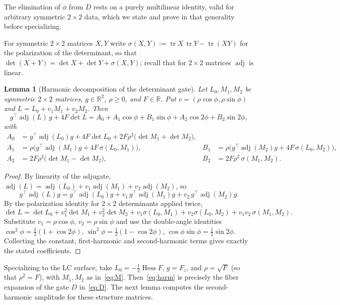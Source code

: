 \documentclass[11pt,reqno]{amsart}
\theoremstyle{plain}
\newtheorem{lemma}[theorem]{Lemma}
\theoremstyle{definition}
\DeclareMathOperator{\tr}{tr}
\DeclareMathOperator{\adj}{adj}
\DeclareMathOperator{\Hess}{Hess}
\newcommand{\R}{\mathbb{R}}
\newcommand{\Fz}{F_{z}}
\begin{document}
The elimination of $\phi$ from $D$ rests on a purely multilinear identity, valid for arbitrary symmetric $2\times2$ data, which we state and prove in that generality before specializing.

For symmetric $2\times2$ matrices $X,Y$ write $\sigma(X,Y):=\tr X\,\tr Y-\tr(XY)$ for the polarization of the determinant, so that $\det(X+Y)=\det X+\det Y+\sigma(X,Y)$; recall that for $2\times2$ matrices $\adj$ is linear.

\begin{lemma}[Harmonic decomposition of the determinant gate]\label{lem:harm}
Let $L_0,M_1,M_2$ be symmetric $2\times 2$ matrices, $g\in\R^2$, $\rho\ge0$, and $F\in\R$. Put $v=(\rho\cos\phi,\rho\sin\phi)$ and $L=L_0+v_1M_1+v_2M_2$. Then
\begin{equation}\label{eq:harm}
g^\top\adj(L)\,g+4F\det L=A_0+A_1\cos\phi+B_1\sin\phi+A_2\cos2\phi+B_2\sin2\phi,
\end{equation}
with
\begin{align*}
A_0&=g^\top\adj(L_0)g+4F\det L_0+2F\rho^2\bigl(\det M_1+\det M_2\bigr),\\
A_1&=\rho\bigl(g^\top\adj(M_1)g+4F\,\sigma(L_0,M_1)\bigr),
&
B_1&=\rho\bigl(g^\top\adj(M_2)g+4F\,\sigma(L_0,M_2)\bigr),\\
A_2&=2F\rho^2\bigl(\det M_1-\det M_2\bigr),
&
B_2&=2F\rho^2\,\sigma(M_1,M_2).
\end{align*}
\end{lemma}

\begin{proof}
By linearity of the adjugate, $\adj(L)=\adj(L_0)+v_1\adj(M_1)+v_2\adj(M_2)$, so
\[
g^\top\adj(L)g=g^\top\adj(L_0)g+v_1\,g^\top\adj(M_1)g+v_2\,g^\top\adj(M_2)g.
\]
By the polarization identity for $2\times2$ determinants applied twice,
\[
\det L=\det L_0+v_1^2\det M_1+v_2^2\det M_2+v_1\sigma(L_0,M_1)+v_2\sigma(L_0,M_2)+v_1v_2\,\sigma(M_1,M_2).
\]
Substitute $v_1=\rho\cos\phi$, $v_2=\rho\sin\phi$ and use the double-angle identities
$\cos^2\phi=\tfrac12(1+\cos2\phi)$, $\sin^2\phi=\tfrac12(1-\cos2\phi)$, $\cos\phi\sin\phi=\tfrac12\sin2\phi$.
Collecting the constant, first-harmonic and second-harmonic terms gives exactly the stated coefficients.
\end{proof}

Specializing to the LC surface, take $L_0=-\tfrac12\Hess F$, $g=\Fz$, and $\rho=\sqrt{F}$ (so that $\rho^2=F$), with $M_1,M_2$ as in~\eqref{eq:M}. Then~\eqref{eq:harm} is precisely the fiber expansion of the gate $D$ in~\eqref{eq:D}. The next lemma computes the second-harmonic amplitude for these structure matrices.
\end{document}
